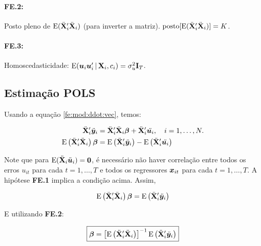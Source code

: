 \documentclass[11pt, oneside, a4paper, article]{article}
\numberwithin{equation}{section}
\begin{document}
\paragraph{FE.2:} Posto pleno de $\text{E}( \ddot{\mathbf{X}}_{i}' \ddot{\mathbf{X}}_{i} )$ (para inverter a matriz).
$\text{posto}[ \text{E}( \ddot{\mathbf{X}}_{i}'  \ddot{\mathbf{X}}_{i} ) ]  = K$.

\paragraph{FE.3:} Homoscedasticidade:
$\text{E}( \boldsymbol{u}_{i} \boldsymbol{u}_{i}' \,|\, \mathbf{X}_{i}, c_{i}) = \sigma_{u}^{2} \mathbf{I}_{T}$.

\subsection{Estimação POLS}

Usando a equação \eqref{fe:mod:ddot:vec}, temos:

\vspace{-1 em}
\begin{align*}
\ddot{\mathbf{X}}_{i}' \ddot{\boldsymbol{y}}_{i} &=
\ddot{\mathbf{X}}_{i}' \ddot{\mathbf{X}}_{i} \boldsymbol{\beta} +
\ddot{\mathbf{X}}_{i}' \ddot{\boldsymbol{u}_{i}},
\quad i = 1, \dots, N.
\\
\text{E}\left( \ddot{\mathbf{X}}_{i}' \ddot{\mathbf{X}}_{i} \right) \boldsymbol{\beta}  &=
\text{E}\left( \ddot{\mathbf{X}}_{i}' \ddot{\boldsymbol{y}}_{i} \right) -
\text{E}\left( \ddot{\mathbf{X}}_{i}' \ddot{\boldsymbol{u}_{i}} \right)
\end{align*}

\noindent
Note que para 
$\text{E}(\ddot{\mathbf{X}}_{i} \ddot{\boldsymbol{u}}_{i}) = \boldsymbol{0}$,
é necessário não haver correlação entre todos os erros 
$u_{it}$ para cada $t = 1, \dots, T$
e todos os regressores 
$\boldsymbol{x}_{it}$ para cada $t = 1, \dots, T$.
A hipótese \textbf{FE.1} implica a condição acima.
Assim,

\vspace{-1 em}
\begin{align*}
\text{E}\left( \ddot{\mathbf{X}}_{i}' \ddot{\mathbf{X}}_{i} \right) \boldsymbol{\beta}  =
\text{E}\left( \ddot{\mathbf{X}}_{i}' \ddot{\boldsymbol{y}}_{i} \right)
\end{align*}

\noindent
E utilizando \textbf{FE.2}:

\vspace{-1 em}
\begin{align}\label{fe:beta}
\boxed{
\boldsymbol{\beta} =
\left[  
\text{E}\left( \ddot{\mathbf{X}}_{i}' \ddot{\mathbf{X}}_{i} \right) \right]^{-1}
\text{E}\left( \ddot{\mathbf{X}}_{i}' \ddot{\boldsymbol{y}}_{i} \right)
}
\end{align}
\end{document}
